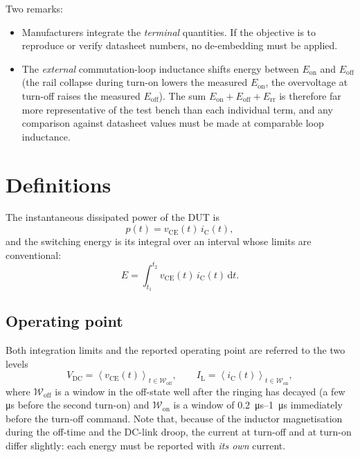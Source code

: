 \documentclass[11pt,a4paper]{article}
\newcommand{\Eon}{E_{\mathrm{on}}}
\newcommand{\Eoff}{E_{\mathrm{off}}}
\newcommand{\Err}{E_{\mathrm{rr}}}
\newcommand{\vce}{v_{\mathrm{CE}}}
\newcommand{\ic}{i_{\mathrm{C}}}
\newcommand{\Vdc}{V_{\mathrm{DC}}}
\newcommand{\IL}{I_{\mathrm{L}}}
\begin{document}
Two remarks:
\begin{itemize}
\item Manufacturers integrate the \emph{terminal} quantities. If the objective is to
reproduce or verify datasheet numbers, no de-embedding must be applied.
\item The \emph{external} commutation-loop inductance shifts energy between $\Eon$ and
$\Eoff$ (the rail collapse during turn-on lowers the measured $\Eon$, the overvoltage at
turn-off raises the measured $\Eoff$). The sum $\Eon+\Eoff+\Err$ is therefore far more
representative of the test bench than each individual term, and any comparison against
datasheet values must be made at comparable loop inductance.
\end{itemize}

\section{Definitions}

The instantaneous dissipated power of the DUT is
\begin{equation}
p(t)=\vce(t)\,\ic(t),
\end{equation}
and the switching energy is its integral over an interval whose limits are conventional:
\begin{equation}
E=\int_{t_1}^{t_2}\vce(t)\,\ic(t)\,\mathrm{d}t .
\end{equation}

\subsection{Operating point}

Both integration limits and the reported operating point are referred to the two levels
\begin{equation}
\Vdc = \left\langle \vce(t)\right\rangle_{t\in\mathcal{W}_{\mathrm{off}}},
\qquad
\IL = \left\langle \ic(t)\right\rangle_{t\in\mathcal{W}_{\mathrm{on}}},
\end{equation}
where $\mathcal{W}_{\mathrm{off}}$ is a window in the off-state well after the ringing has
decayed (a few \si{\micro\second} before the second turn-on) and
$\mathcal{W}_{\mathrm{on}}$ is a window of \SIrange{0.2}{1}{\micro\second} immediately
before the turn-off command. Note that, because of the inductor magnetisation during the
off-time and the DC-link droop, the current at turn-off and at turn-on differ slightly:
each energy must be reported with \emph{its own} current.
\end{document}
